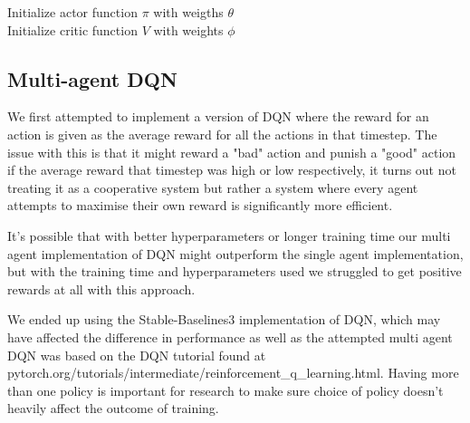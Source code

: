 \documentclass[conference]{IEEEtran}
\begin{document}
	\begin{algorithm}[h!]
		Initialize actor function $\pi$ with weigths $\theta$ \\
		Initialize critic function $V$ with weights $\phi$\\

	\end{algorithm}

	\subsection{Multi-agent DQN}
	We first attempted to implement a version of DQN where the reward for an action is given as the average reward for
	all the actions in that timestep. The issue with this is that it might reward a "bad" action and
	punish a "good" action if the average reward that timestep was high or low respectively, it turns
	out not treating it as a cooperative system but rather a system where every agent attempts to
	maximise their own reward is significantly more efficient.

	It's possible that with better hyperparameters or longer training time our multi agent
	implementation of DQN might outperform the single agent implementation, but with the training
	time and hyperparameters used we struggled to get positive rewards at all with this approach.

	We ended up using the Stable-Baselines3 implementation of DQN, which may have affected the
	difference in performance as well as the attempted multi agent DQN was based on the DQN tutorial
	found at pytorch.org/tutorials/intermediate/reinforcement\_q\_learning.html. Having more than one
	policy is important for research to make sure choice of policy doesn't heavily affect the outcome
	of training.
\end{document}
